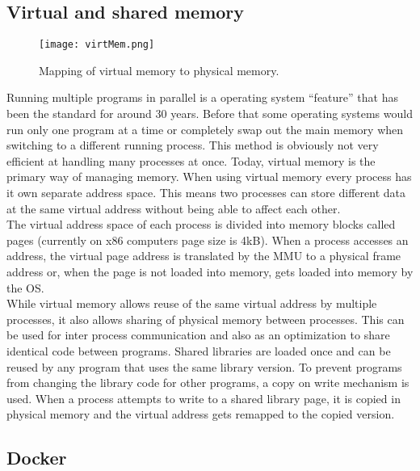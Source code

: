 \documentclass[conference,compsoc,final,a4paper]{IEEEtran}
\begin{document}
\subsection{Virtual and shared memory}
\begin{figure}[!ht]
\centering
\texttt{[image: virtMem.png]}
\caption{Mapping of virtual memory to physical memory. \cite{tanenbaum1997operating}}
\label{virtmem}
\end{figure}
Running multiple programs in parallel is a operating system \enquote{feature} that has been the standard for around 30 years. Before that some operating systems would run only one program at a time or completely swap out the main memory when switching to a different running process. \cite{tanenbaum1997operating} This method is obviously not very efficient at handling many processes at once. Today, virtual memory is the primary way of managing memory. When using virtual memory every process has it own separate address space. This means two processes can store different data at the same virtual address without being able to affect each other. \cite[p.~620]{hennessy2011computer}\\
The virtual address space of each process is divided into memory blocks called pages (currently on x86 computers page size is 4kB). When a process accesses an address, the virtual page address is translated by the \ac{MMU} to a physical frame address or, when the page is not loaded into memory, gets loaded into memory by the OS. \\
While virtual memory allows reuse of the same virtual address by multiple processes, it also allows sharing of physical memory between processes. This can be used for inter process communication and also as an optimization to share identical code between programs. Shared libraries are loaded once and can be reused by any program that uses the same library version. \cite{tanenbaum1997operating} To prevent programs from changing the library code for other programs, a copy on write mechanism is used. When a process attempts to write to a shared library page, it is copied in physical memory and the virtual address gets remapped to the copied version. \cite[p.~295]{bovet2005understanding}
\subsection{Docker}
\end{document}
